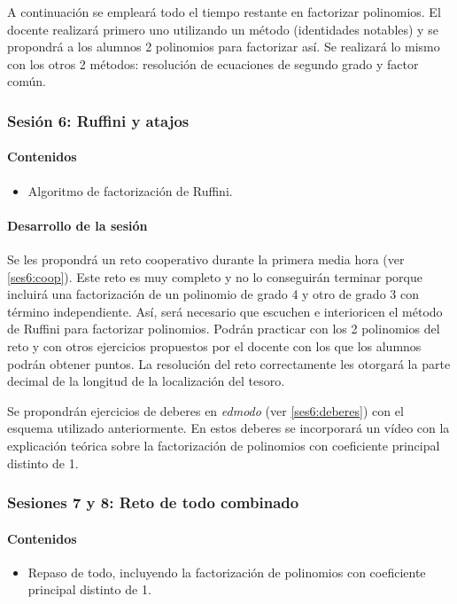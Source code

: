 A continuación se empleará todo el tiempo restante en factorizar polinomios.
%
El docente realizará primero uno utilizando un método (identidades notables) y se propondrá a los alumnos 2 polinomios para factorizar así.
%
Se realizará lo mismo con los otros 2 métodos: resolución de ecuaciones de segundo grado y factor común.


\subsubsection{Sesión 6: Ruffini y atajos}

\paragraph{Contenidos}
\begin{itemize}
	\item Algoritmo de factorización de Ruffini.
\end{itemize}

\paragraph{Desarrollo de la sesión}

Se les propondrá un reto cooperativo durante la primera media hora (ver \ref{ses6:coop}).
%
Este reto es muy completo y no lo conseguirán terminar porque incluirá una factorización de un polinomio de grado 4 y otro de grado 3 con término independiente.
%
Así, será necesario que escuchen e interioricen el método de Ruffini para factorizar polinomios.
%
Podrán practicar con los 2 polinomios del reto y con otros ejercicios propuestos por el docente con los que los alumnos podrán obtener puntos.
%
La resolución del reto correctamente les otorgará la parte decimal de la longitud de la localización del tesoro.

Se propondrán ejercicios de deberes en \textit{edmodo} (ver \ref{ses6:deberes}) con el esquema utilizado anteriormente.
%
En estos deberes se incorporará un vídeo con la explicación teórica sobre la factorización de polinomios con coeficiente principal distinto de 1.

\subsubsection{Sesiones 7 y 8: Reto de todo combinado}

\paragraph{Contenidos}
\begin{itemize}
	\item Repaso de todo, incluyendo la factorización de polinomios con coeficiente principal distinto de 1.
\end{itemize}

